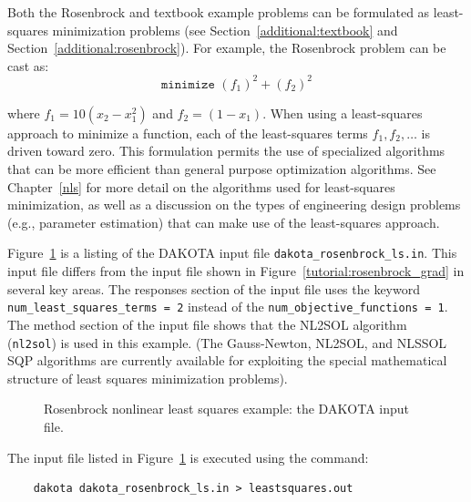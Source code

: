 Both the Rosenbrock and textbook example problems can be formulated as
least-squares minimization problems (see
Section~\ref{additional:textbook} and
Section~\ref{additional:rosenbrock}). For example, the Rosenbrock
problem can be cast as:
\begin{equation}
\texttt{minimize } (f_1)^2 + (f_2)^2
\end{equation}

where $f_1 = 10(x_2-x_1^2)$ and $f_2 = (1-x_1)$. When
using a least-squares approach to minimize a function, each of the
least-squares terms $f_1, f_2,\ldots$ is driven toward zero. This
formulation permits the use of specialized algorithms that can be more
efficient than general purpose optimization algorithms. See
Chapter~\ref{nls} for more detail on the algorithms used for least-squares
minimization, as well as a discussion on the types of
engineering design problems (e.g., parameter estimation) that can make
use of the least-squares approach.

Figure~\ref{tutorial:rosenbrock_nls} is a listing of the DAKOTA input
file \texttt{dakota\_rosenbrock\_ls.in}. This input file differs from
the input file shown in Figure~\ref{tutorial:rosenbrock_grad} in
several key areas. The responses section of the input file uses the
keyword \texttt{num\_least\_squares\_terms = 2} instead of the
\texttt{num\_objective\_functions = 1}.
The method section of the input file shows that the NL2SOL
algorithm~\cite{Den81} (\texttt{nl2sol}) is used in this example.  (The
Gauss-Newton, NL2SOL, and NLSSOL SQP algorithms are currently
available for exploiting the special mathematical structure of least
squares minimization problems).

\begin{figure}[ht!]
  \centering
  \begin{bigbox}
    \begin{small}
    \end{small}
  \end{bigbox}
  \caption{Rosenbrock nonlinear least squares example: the DAKOTA input file.}
  \label{tutorial:rosenbrock_nls}
\end{figure}

The input file listed in Figure~\ref{tutorial:rosenbrock_nls} is
executed using the command:
\begin{small}
\begin{verbatim}
    dakota dakota_rosenbrock_ls.in > leastsquares.out
\end{verbatim}
\end{small}

